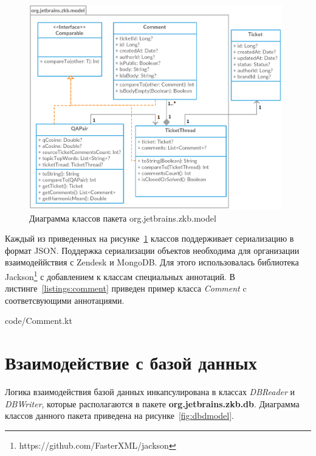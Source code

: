 \begin{figure}[tph!]
\centerline{\includegraphics[width=11cm]{fig/model.png}}
    \caption{Диаграмма классов пакета org.jetbrains.zkb.model}
    \label{fig:umodel}
\end{figure}

Каждый из приведенных на рисунке~\ref{fig:umodel} классов поддерживает сериализацию в формат JSON. Поддержка сериализации объектов необходима для организации взаимодеййствия с Zendesk и MongoDB. Для этого использовалась библиотека Jackson\footnote{https://github.com/FasterXML/jackson} с добавлением к классам специальных аннотаций. В листинге~\ref{listings:comment} приведен пример класса \textit{Comment} c соответсвующими аннотациями.


{code/Comment.kt}

\section{Взаимодействие с базой данных}

Логика взаимодействия базой данных инкапсулирована в классах \textit{DBReader} и \textit{DBWriter}, которые располагаются в пакете \textbf{org.jetbrains.zkb.db}. Диаграмма классов данного пакета приведена на рисунке~\ref{fig:dbdmodel}.

